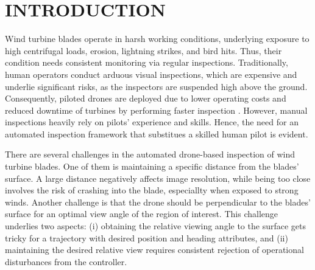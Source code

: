 
\section{INTRODUCTION}




Wind turbine blades operate in harsh working conditions, underlying exposure to high centrifugal loads, erosion, lightning strikes, and bird hits. Thus, their condition needs consistent monitoring via regular inspections. Traditionally, human operators conduct arduous visual inspections, which are expensive and underlie significant risks, as the inspectors are suspended high above the ground. Consequently, piloted drones are deployed due to lower operating costs and reduced downtime of turbines by performing faster inspection \cite{NLR}. However, manual inspections heavily rely on pilots' experience and skills. Hence, the need for an automated inspection framework that substitues a skilled human pilot is evident.

There are several challenges in the automated drone-based inspection of wind turbine blades. One of them is maintaining a specific distance from the blades’ surface. A large distance negatively affects image resolution, while being too close involves the risk of crashing into the blade, especiallty when exposed to strong winds.
Another challenge is that the drone should be perpendicular to the blades’ surface for an optimal view angle of the region of interest. This challenge underlies two aspects: (i) obtaining the relative viewing angle to the surface gets tricky for a trajectory with desired position and heading attributes, and (ii) maintaining the desired relative view requires consistent rejection of operational disturbances from the controller.





